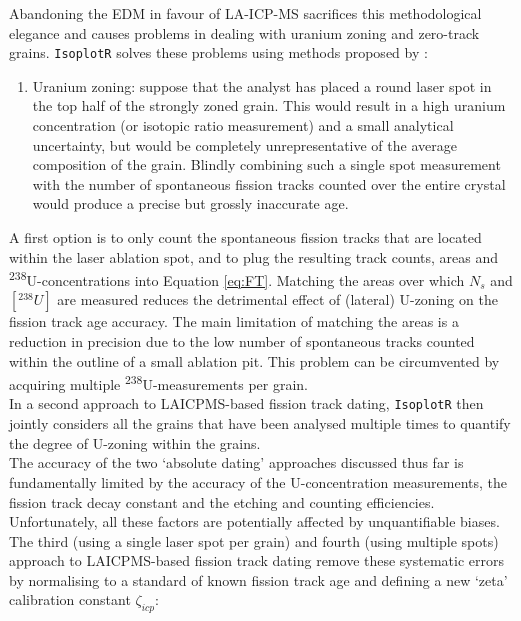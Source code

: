 \begin{refsection}
Abandoning the EDM in favour of LA-ICP-MS sacrifices this
methodological elegance and causes problems in dealing with uranium
zoning and zero-track grains. \texttt{IsoplotR} solves these problems
using methods proposed by \citet{vermeesch20017}:

\begin{enumerate}
\item{Uranium zoning}: suppose that the analyst has placed a round
  laser spot in the top half of the strongly zoned grain. This would
  result in a high uranium concentration (or isotopic ratio
  measurement) and a small analytical uncertainty, but would be
  completely unrepresentative of the average composition of the
  grain. Blindly combining such a single spot measurement with the
  number of spontaneous fission tracks counted over the entire crystal
  would produce a precise but grossly inaccurate age.

\end{enumerate}

A first option is to only count the spontaneous fission tracks that
are located within the laser ablation spot, and to plug the resulting
track counts, areas and \textsuperscript{238}U-concentrations into
Equation \ref{eq:FT}.  Matching the areas over which $N_s$ and
$[{}^{238}U]$ are measured reduces the detrimental effect of (lateral)
U-zoning on the fission track age accuracy. The main limitation of
matching the areas is a reduction in precision due to the low number
of spontaneous tracks counted within the outline of a small ablation
pit. This problem can be circumvented by acquiring multiple
\textsuperscript{238}U-measurements per grain.\\

In a second approach to LAICPMS-based fission track dating,
\texttt{IsoplotR} then jointly considers all the grains that have been
analysed multiple times to quantify the degree of U-zoning within the
grains.\\

The accuracy of the two `absolute dating' approaches discussed thus
far is fundamentally limited by the accuracy of the U-concentration
measurements, the fission track decay constant and the etching and
counting efficiencies.  Unfortunately, all these factors are
potentially affected by unquantifiable biases.\\

The third (using a single laser spot per grain) and fourth (using
multiple spots) approach to LAICPMS-based fission track dating remove
these systematic errors by normalising to a standard of known fission
track age and defining a new `zeta' calibration constant
$\zeta_{icp}$:


\end{refsection}
